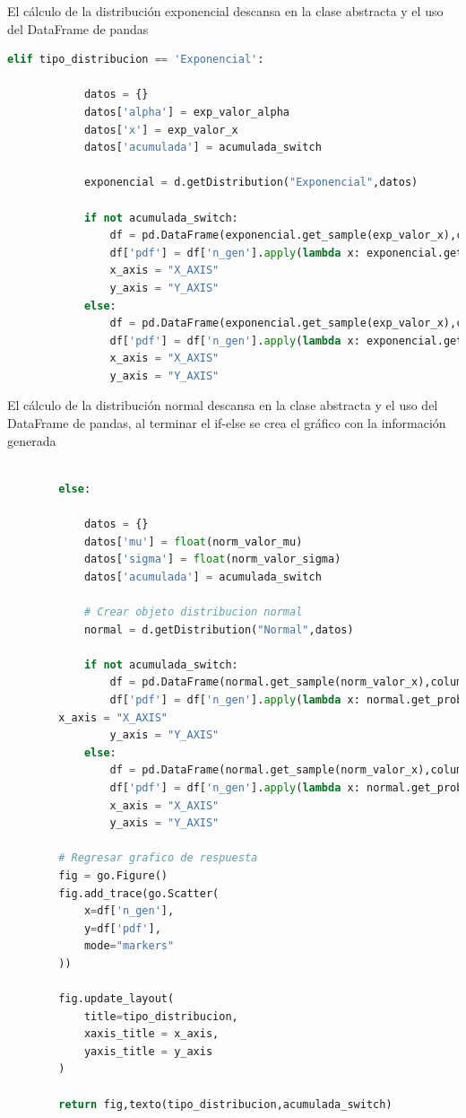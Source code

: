\documentclass[
	12pt, %
]{fphw}
\begin{document}
\newpage
El cálculo de la distribución exponencial descansa en la clase abstracta y el uso del DataFrame de pandas

\begin{lstlisting}[language=Python,caption=Distribucion Geometrica]
        elif tipo_distribucion == 'Exponencial':

            datos = {}
            datos['alpha'] = exp_valor_alpha
            datos['x'] = exp_valor_x
            datos['acumulada'] = acumulada_switch

            exponencial = d.getDistribution("Exponencial",datos)

            if not acumulada_switch:
                df = pd.DataFrame(exponencial.get_sample(exp_valor_x),columns=['n_gen'])
                df['pdf'] = df['n_gen'].apply(lambda x: exponencial.get_probability(x))
                x_axis = "X_AXIS"
                y_axis = "Y_AXIS"
            else:
                df = pd.DataFrame(exponencial.get_sample(exp_valor_x),columns=['n_gen'])
                df['pdf'] = df['n_gen'].apply(lambda x: exponencial.get_probability_cdf(x))
                x_axis = "X_AXIS"
                y_axis = "Y_AXIS"
\end{lstlisting}
\newpage
El cálculo de la distribución normal descansa en la clase abstracta y el uso del DataFrame de pandas, al terminar el if-else se crea el gráfico con la información generada

\begin{lstlisting}[language=Python,caption=Distribucion Geometrica]

        else:

            datos = {}
            datos['mu'] = float(norm_valor_mu)
            datos['sigma'] = float(norm_valor_sigma)
            datos['acumulada'] = acumulada_switch

            # Crear objeto distribucion normal                                                             
            normal = d.getDistribution("Normal",datos)

            if not acumulada_switch:
                df = pd.DataFrame(normal.get_sample(norm_valor_x),columns=['n_gen'])
                df['pdf'] = df['n_gen'].apply(lambda x: normal.get_probability(x))
		x_axis = "X_AXIS"
                y_axis = "Y_AXIS"
            else:
                df = pd.DataFrame(normal.get_sample(norm_valor_x),columns=['n_gen'])
                df['pdf'] = df['n_gen'].apply(lambda x: normal.get_probability_cdf(x))
                x_axis = "X_AXIS"
                y_axis = "Y_AXIS"

        # Regresar grafico de respuesta                                                                    
        fig = go.Figure()
        fig.add_trace(go.Scatter(
            x=df['n_gen'],
            y=df['pdf'],
            mode="markers"
        ))

        fig.update_layout(
            title=tipo_distribucion,
            xaxis_title = x_axis,
            yaxis_title = y_axis
        )

        return fig,texto(tipo_distribucion,acumulada_switch)
\end{lstlisting}
\end{document}
